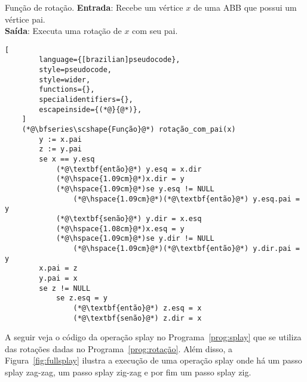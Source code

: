 \begin{programruledcaption}{Função de rotação.\label{prog:rotação}}
    \noindent\textbf{Entrada}: Recebe um vértice $x$ de uma ABB que possui um vértice pai.\\
    \textbf{Saída}: Executa uma rotação de $x$ com seu pai. 
    \vspace{-0.5\baselineskip}
    \begin{lstlisting}[
        language={[brazilian]pseudocode},
        style=pseudocode,
        style=wider,
        functions={},
        specialidentifiers={},
        escapeinside={(*@}{@*)},
    ]
    (*@\bfseries\scshape{Função}@*) rotação_com_pai(x)
        y := x.pai
        z := y.pai
        se x == y.esq
            (*@\textbf{então}@*) y.esq = x.dir
            (*@\hspace{1.09cm}@*)x.dir = y
            (*@\hspace{1.09cm}@*)se y.esq != NULL
                (*@\hspace{1.09cm}@*)(*@\textbf{então}@*) y.esq.pai = y
            (*@\textbf{senão}@*) y.dir = x.esq
            (*@\hspace{1.08cm}@*)x.esq = y
            (*@\hspace{1.09cm}@*)se y.dir != NULL
                (*@\hspace{1.09cm}@*)(*@\textbf{então}@*) y.dir.pai = y
        x.pai = z
        y.pai = x
        se z != NULL
            se z.esq = y
                (*@\textbf{então}@*) z.esq = x
                (*@\textbf{senão}@*) z.dir = x

    \end{lstlisting}
    \vspace{-0.5\baselineskip}
\end{programruledcaption}

A seguir veja o código da operação splay no Programa~\ref{prog:splay} que se utiliza das rotações dadas no Programa~\ref{prog:rotação}. Além disso, a Figura~\ref{fig:fullsplay} ilustra a execução de uma operação splay onde há um passo splay zag-zag, um passo splay zig-zag e por fim um passo splay zig.

